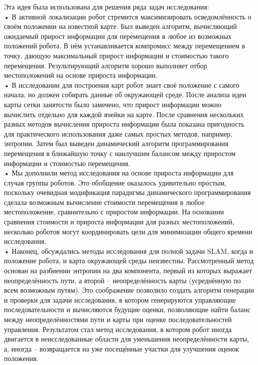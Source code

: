 \documentclass[10pt,a4paper]{article}
\begin{document}
Эта идея была использована для решения ряда задач исследования:\\

•	В активной локализации робот стремится максимизировать осведомлённость о своём положении на известной карте. Был выведен алгоритм, вычисляющий ожидаемый прирост информации для перемещения в любое из возможных положений робота. В нём устанавливается компромисс между перемещением в точку, дающую максимальный прирост информации и стоимостью такого перемещения. Результирующий алгоритм хорошо выполняет отбор местоположений на основе прироста информации.\\

•	В исследовании для построения карт робот знает своё положение с самого начала, но должен собирать данные об окружающей среде. После анализа идеи карты сетки занятости было замечено, что прирост информации можно вычислить отдельно для каждой ячейки на карте. После сравнения нескольких разных методов вычисления прироста информации была показана пригодность для практического использования даже самых простых методов, например, энтропии. Затем был выведен динамический алгоритм программирования перемещения в ближайшую точку с наилучшим балансом между приростом информации и стоимостью перемещения.\\

•	Мы дополнили метод исследования на основе прироста информации для случая группы роботов. Это обобщение оказалось удивительно простым, поскольку очевидная модификация парадигмы динамического программирования сделала возможным вычисление стоимости перемещения в любое местоположение, сравнительно с приростом информации. На основании сравнения стоимости и прироста информации для разных местоположений, несколько роботов могут координировать цели для минимизации общего времени исследования.\\

•	Наконец, обсуждались методы исследования для полной задачи SLAM, когда и положение робота, и карта окружающей среды неизвестны. Рассмотренный метод основан на разбиении энтропии на два компонента, первый из которых выражает неопределённость пути, а второй – неопределённость карты (усреднённую по всем возможным путям). Это соображение позволило создать алгоритм генерации и проверки для задачи исследования, в котором генерируются управляющие последовательности и вычисляются будущие оценки, позволяющие найти баланс между неопределённостями пути и карты при оценке последовательностей управления. Результатом стал метод исследования, в котором робот иногда двигается в неисследованные области для уменьшения неопределённости карты, а, иногда – возвращается на уже посещённые участки для улучшения оценок положения.\\
\end{document}
